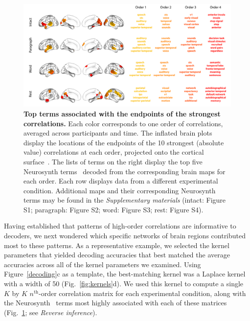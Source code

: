 \documentclass[english]{article}
\begin{document}
\begin{figure}[tp]
  \centering
  \includegraphics[width=\textwidth]{figs/most_abs}
  \caption{\textbf{Top terms associated with the endpoints of the
      strongest correlations.}  Each color corresponds to one order of
    correlations, averaged across participants and time. The inflated
    brain plots display the locations of the endpoints of the 10
    strongest (absolute value) correlations at each order, projected
    onto the cortical surface~\citep{CombEtal19}.  The lists of terms
    on the right display the top five Neurosynth
    terms~\citep{RubiEtal17} decoded from the corresponding brain maps
    for each order.  Each row displays data from a different
    experimental condition.  Additional maps and their corresponding
    Neurosynth terms may be found in the \textit{Supplementary
      materials} (intact: Figure S1; paragraph: Figure S2; word:
    Figure S3; rest: Figure S4).}
  \label{fig:neurosynth}
\end{figure}

Having established that patterns of high-order correlations are
informative to decoders, we next wondered which specific networks of
brain regions contributed most to these patterns.  As a representative
example, we selected the kernel parameters that yielded decoding
accuracies that best matched the average accuracies across all of the
kernel parameters we examined.  Using Figure~\ref{decoding}c as a
template, the best-matching kernel was a Laplace kernel with a width
of 50 (Fig.~\ref{fig:kernels}d).  We used this kernel to compute a
single $K$ by $K$ $n^\mathrm{th}$-order correlation matrix for each
experimental condition, along with the Neurosynth~\citep{RubiEtal17}
terms most highly associated with each of these matrices
(Fig.~\ref{fig:neurosynth}; see \textit{Reverse inference}).
\end{document}
